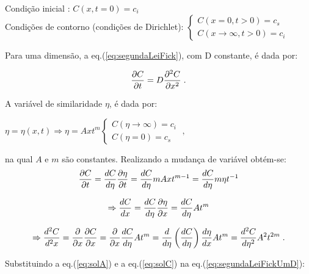\documentclass[]{politex}
\begin{document}
\begin{center} 
	Condição inicial : $C(x,t=0) = c_i$  \\
	Condições de contorno (condições de Dirichlet): 
	\begin{math}
  		\left\{
    	\begin{array}{l}
      		C(x=0,t>0) = c_s\\
      		C(x\rightarrow \infty, t>0) = c_i
    	\end{array}
  		\right.
	\end{math}
\end{center}

Para uma dimensão, a eq.(\ref{eq:segundaLeiFick}), com D constante, é dada por:

\begin{equation} \label{eq:segundaLeiFickUmD}
 \pdv{C}{t} = D\pdv[2]{C}{x} \; .
\end{equation}

A variável de similaridade $\eta$, é dada por:

\begin{center}
	\begin{math}
		\eta = \eta(x,t) \Rightarrow \eta = Axt^m
		\left\{
    		\begin{array}{l}
      			C(\eta\rightarrow \infty) = c_i\\
      			C(\eta=0) = c_s
    		\end{array}
		\right.
		\; ,
	\end{math}
\end{center}

na qual $A$ e $m$ são constantes.
Realizando a mudança de variável obtém-se:
\begin{equation} \label{eq:solA}
 \pdv{C}{t} = \frac{dC}{d\eta}\pdv{\eta}{t} = \frac{dC}{d\eta}mAxt^{m-1} = \frac{dC}{d\eta}m\eta t^{-1}
\end{equation}

\begin{equation} \label{eq:solB}
\Rightarrow \frac{dC}{dx} = \frac{dC}{d\eta}\pdv{\eta}{x} = \frac{dC}{d\eta}At^m
\end{equation}

\begin{equation} \label{eq:solC}
\Rightarrow \frac{d^2C}{d^2x} = \pdv{}{x}\pdv{C}{x} = \pdv{ }{x} \frac{dC}{d\eta}At^m = \frac{d}{d\eta}\left(\frac{dC}{d\eta}\right)\frac{d\eta}{dx}At^m = \frac{d^2C}{d\eta ^2}A^2t^{2m} \;.
\end{equation}

Substituindo a eq.(\ref{eq:solA}) e a eq.(\ref{eq:solC}) na eq.(\ref{eq:segundaLeiFickUmD}):
\end{document}
